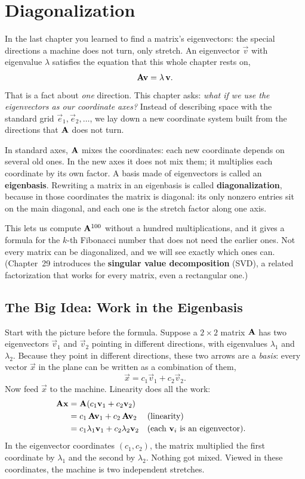 \chapter{Diagonalization}

In the last chapter you learned to find a matrix's eigenvectors: the special
directions a machine does not turn, only stretch. An eigenvector $\vec{v}$ with
eigenvalue $\lambda$ satisfies the equation that this whole chapter rests on,
\[
  \mathbf{A}\mathbf{v} = \lambda\,\mathbf{v}.
\]
That is a fact about \emph{one} direction. This chapter asks: \emph{what if we
use the eigenvectors as our coordinate axes?} Instead of describing space with
the standard grid $\vec{e}_1, \vec{e}_2, \dots$, we lay down a new coordinate
system built from the directions that $\mathbf{A}$ does not turn.

In standard axes, $\mathbf{A}$ mixes the coordinates: each new coordinate depends on
several old ones. In the new axes it does not mix them; it multiplies each
coordinate by its own factor. A basis made of eigenvectors is called an
\textbf{eigenbasis}. Rewriting a matrix in an eigenbasis is called
\textbf{diagonalization}, because in those coordinates the matrix is diagonal:
its only nonzero entries sit on the main diagonal, and each one is the stretch
factor along one axis.

This lets us compute $\mathbf{A}^{100}$ without a hundred multiplications, and it
gives a formula for the $k$-th Fibonacci number that does not need the earlier
ones. Not every matrix can be diagonalized, and we will see exactly which ones
can. (Chapter~29 introduces the \textbf{singular value decomposition} (SVD), a
related factorization that works for every matrix, even a rectangular one.)

\section{The Big Idea: Work in the Eigenbasis}
\label{ch24:big-idea}

Start with the picture before the formula. Suppose a $2\times 2$ matrix
$\mathbf{A}$ has two eigenvectors $\vec{v}_1$ and $\vec{v}_2$ pointing in different
directions, with eigenvalues $\lambda_1$ and $\lambda_2$. Because they point in
different directions, these two arrows are a \emph{basis}: every vector $\vec{x}$
in the plane can be written as a combination of them,
\[
  \vec{x} = c_1\vec{v}_1 + c_2\vec{v}_2.
\]
Now feed $\vec{x}$ to the machine. Linearity does all the work:
\begin{align*}
  \mathbf{A}\mathbf{x}
  &= \mathbf{A}(c_1\mathbf{v}_1 + c_2\mathbf{v}_2) \\
  &= c_1\,\mathbf{A}\mathbf{v}_1 + c_2\,\mathbf{A}\mathbf{v}_2 && \text{(linearity)} \\
  &= c_1\lambda_1\mathbf{v}_1 + c_2\lambda_2\mathbf{v}_2 && \text{(each $\mathbf{v}_i$ is an eigenvector).}
\end{align*}
In the eigenvector coordinates $(c_1, c_2)$, the matrix multiplied
the first coordinate by $\lambda_1$ and the second by $\lambda_2$. Nothing got
mixed. Viewed in these coordinates, the machine is two independent stretches.

